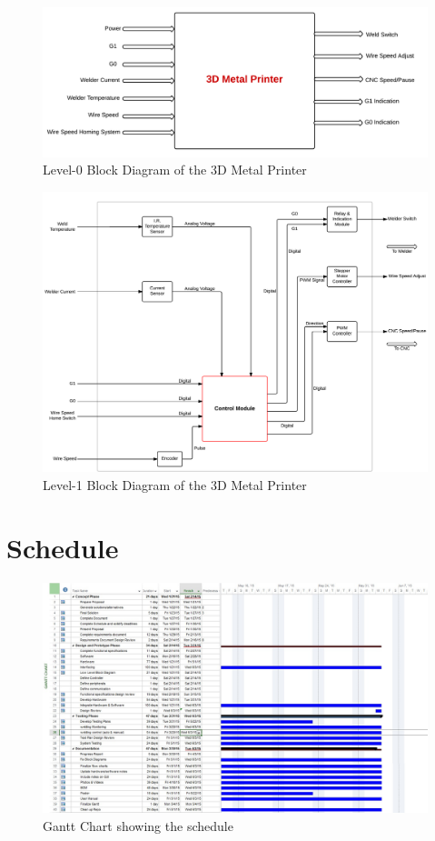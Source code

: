 \documentclass[12pt]{article}
\begin{document}
\begin{figure}[!h]
\centering
\includegraphics[scale=0.9]{mainfc}
\caption{Level-0 Block Diagram of the 3D Metal Printer}
\end{figure}

\clearpage

\begin{figure}[h]
\centering
\includegraphics[scale=0.655,angle=90]{detailedflo}
\caption{Level-1 Block Diagram of the 3D Metal Printer}
\end{figure}

\clearpage

\section{Schedule}

\begin{figure}[!h]
\centering
\includegraphics[scale=0.43,angle=90]{finalganttchart}
\caption{Gantt Chart showing the schedule}
\end{figure}
\end{document}
